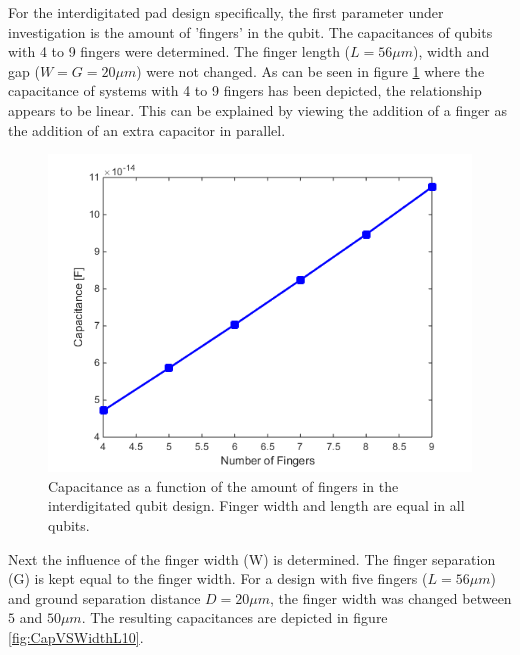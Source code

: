 For the interdigitated pad design specifically, the first parameter under investigation is the amount of 'fingers' in the  qubit. The capacitances of qubits with 4 to 9 fingers were determined. The finger length (\(L=56\mu m\)), width and gap (\(W=G=20\mu m\)) were not changed.
As can be seen in figure \ref{fig:CapVSFingers} where the capacitance of systems with 4 to 9 fingers has been depicted, the relationship appears to be linear. This can be explained by viewing the addition of a finger as the addition of an extra capacitor in parallel.

\begin{figure}
	\centering
	\includegraphics[scale = 0.7]{Figures/Capacitance_Plots/CapVSFingers.png}
	\caption{Capacitance as a function of the amount of fingers in the interdigitated qubit design. Finger width and length are equal in all qubits.}
	\label{fig:CapVSFingers}
\end{figure}

Next the influence of the finger width (W) is determined. The finger separation (G) is kept equal to the finger width. For a design with five fingers (\(L=56\mu m\)) and ground separation distance \(D = 20\mu m\), the finger width was changed between \(5\) and \(50\mu m\). The resulting capacitances are depicted in figure \ref{fig:CapVSWidthL10}.

